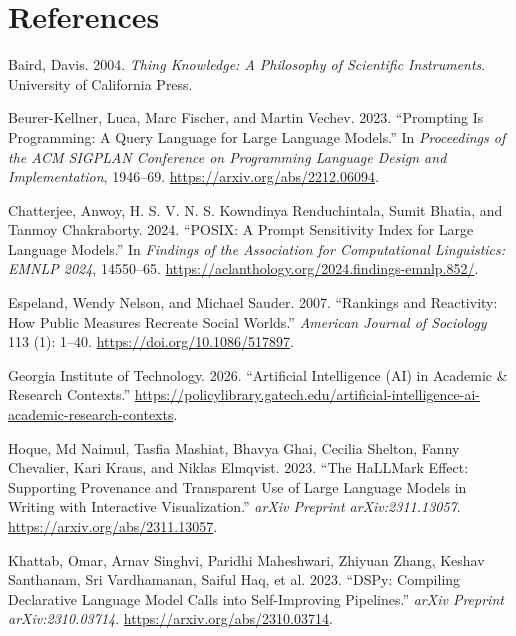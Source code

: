 \documentclass[
]{article}
\newlength{\cslhangindent}
\newenvironment{CSLReferences}[2] %
 {\begin{list}{}{%
  \setlength{\itemindent}{0pt}
  \setlength{\leftmargin}{0pt}
  \setlength{\parsep}{0pt}
  \ifodd #1
   \setlength{\leftmargin}{\cslhangindent}
   \setlength{\itemindent}{-1\cslhangindent}
  \fi
  \setlength{\itemsep}{#2\baselineskip}}}
 {\end{list}}
\begin{document}
\section*{References}\label{bibliography}

\label{refs}
\begin{CSLReferences}{1}{0}
Baird, Davis. 2004. \emph{Thing Knowledge: A Philosophy of Scientific
Instruments}. University of California Press.

Beurer-Kellner, Luca, Marc Fischer, and Martin Vechev. 2023.
{``Prompting Is Programming: A Query Language for Large Language
Models.''} In \emph{Proceedings of the ACM SIGPLAN Conference on
Programming Language Design and Implementation}, 1946--69.
\url{https://arxiv.org/abs/2212.06094}.

Chatterjee, Anwoy, H. S. V. N. S. Kowndinya Renduchintala, Sumit Bhatia,
and Tanmoy Chakraborty. 2024. {``POSIX: A Prompt Sensitivity Index for
Large Language Models.''} In \emph{Findings of the Association for
Computational Linguistics: EMNLP 2024}, 14550--65.
\url{https://aclanthology.org/2024.findings-emnlp.852/}.

Espeland, Wendy Nelson, and Michael Sauder. 2007. {``Rankings and
Reactivity: How Public Measures Recreate Social Worlds.''}
\emph{American Journal of Sociology} 113 (1): 1--40.
\url{https://doi.org/10.1086/517897}.

Georgia Institute of Technology. 2026. {``Artificial Intelligence (AI)
in Academic \& Research Contexts.''}
\url{https://policylibrary.gatech.edu/artificial-intelligence-ai-academic-research-contexts}.

Hoque, Md Naimul, Tasfia Mashiat, Bhavya Ghai, Cecilia Shelton, Fanny
Chevalier, Kari Kraus, and Niklas Elmqvist. 2023. {``The HaLLMark
Effect: Supporting Provenance and Transparent Use of Large Language
Models in Writing with Interactive Visualization.''} \emph{arXiv
Preprint arXiv:2311.13057}. \url{https://arxiv.org/abs/2311.13057}.

Khattab, Omar, Arnav Singhvi, Paridhi Maheshwari, Zhiyuan Zhang, Keshav
Santhanam, Sri Vardhamanan, Saiful Haq, et al. 2023. {``DSPy: Compiling
Declarative Language Model Calls into Self-Improving Pipelines.''}
\emph{arXiv Preprint arXiv:2310.03714}.
\url{https://arxiv.org/abs/2310.03714}.


\end{CSLReferences}
\end{document}
